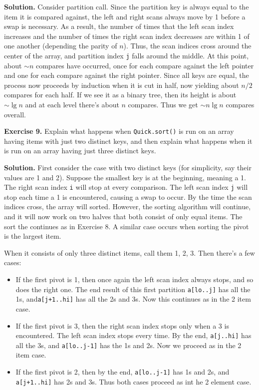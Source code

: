 \documentclass[12pt, a4paper]{article}
\newenvironment{ex}[2][Exercise]
{\par\medskip\noindent \textbf{#1 #2.}}
{\medskip}
\newenvironment{sol}[1][Solution]
{\par\medskip\noindent \textbf{#1.} }
{\medskip}
\begin{document}
	\begin{sol}
		Consider partition call. Since the partition key is always equal to the item
		it is compared against, the left and right scans always move by 1 before
		a swap is necessary. As a result, the number of times that the left scan
		index increases and the number of times the right scan index decreases are
		within 1 of one another (depending the parity of $n$). Thus, the scan indices
		cross around the center of the array, and partition index \texttt{j} falls
		around the middle. At this point, about $\sim n$ compares have occurred,
		once for each compare against the left pointer and one for each compare
		against the right pointer. Since all keys are equal, the process now proceeds
		by induction when it is cut in half, now yielding about $n/2$ compares for
		each half. If we see it as a binary tree, then its height is about $\sim \lg n$
		and at each level there's about $n$  compares. Thus we get $\sim n\lg n$
		compares overall.
	\end{sol}
	\begin{ex}{9}
		Explain what happens when \texttt{Quick.sort()} is run on an array having items
		with just two distinct keys, and then explain what happens when it is run on an
		array having just three distinct keys.
	\end{ex}
	\begin{sol}
		First consider the case with two distinct keys (for simplicity, say their values
		are 1 and 2). Suppose the smallest key is at the beginning, meaning a 1. The right
		scan index \texttt{i} will stop at every comparison. The left scan index \texttt{j}
		will stop each time a 1 is encountered, causing a swap to occur. By the time the 
		scan indices cross, the array will sorted. However, the sorting algorithm will
		continue, and it will now work on two halves that both consist of only equal
		items. The sort the continues as in Exercise 8. A similar case occurs when
		sorting the pivot is the largest item.
		
		When it consists of only three distinct items, call them 1, 2, 3. Then
		there's a few cases:
		\begin{itemize}
			\item If the first pivot is 1, then once again the left scan index always stops,
			and so does the right one. The end result of this first partition
			\texttt{a[lo..j]} has all the 1s, and\texttt{a[j+1..hi]} has all the 2s
			and 3s. Now this continues as in the 2 item case.
			\item If the first pivot is 3, then the right scan index stops only
			when a 3 is encountered. The left scan index stops every time. By
			the end, \texttt{a[j..hi]} has all the 3s,  and \texttt{a[lo..j-1]}
			has the 1s and 2s. Now we proceed as in the 2 item case.
			\item If the first pivot is 2, then by the end, \texttt{a[lo..j-1]}
			has 1s and 2s, and \texttt{a[j+1..hi]} has 2s and 3s. Thus both cases
			proceed as int he 2 element case.
		\end{itemize}
	\end{sol}
\end{document}
